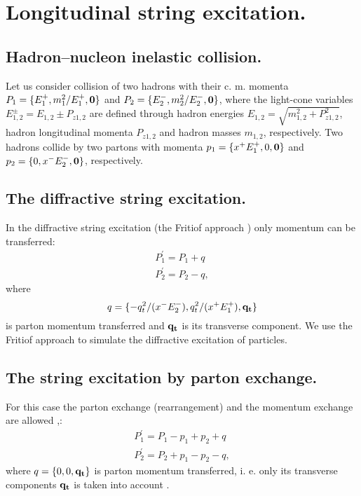 \section{Longitudinal string excitation.}

\subsection{Hadron--nucleon inelastic collision.}

\hspace{1.0em}Let us consider collision of two hadrons with their c. m. momenta 
$P_1 = \{E^{+}_1,m^2_1/E^{+}_1,{\bf 0}\}$ and $P_2 =
\{E^{-}_2,m^2_2/E^{-}_2,{\bf 0}\}$, where the light-cone variables
$E^{\pm}_{1,2} = E_{1,2} \pm P_{z1,2}$ are defined through hadron
energies $E_{1,2}=\sqrt{m^2_{1,2} + P^2_{z1,2}}$, hadron longitudinal
momenta $P_{z1,2}$ and hadron masses $m_{1,2}$, respectively. Two
hadrons collide by two partons with momenta $p_1 = \{x^{+}E^{+}_1,0,{\bf
0}\}$ and $p_2 = \{0, x^{-}E^{-}_2,{\bf 0}\}$, respectively.

\subsection{The diffractive string excitation.} 

In the diffractive string excitation (the Fritiof approach \cite{FRITIOF87})
 only momentum can be transferred:
\begin{equation}
\label{LSE1}
\begin{array}{cc}
P^{\prime}_1 = P_1 + q\\
P^{\prime}_2 = P_2 -q,
\end{array}
\end{equation}
where 
\begin{equation}
\label{LSE2}q=\{-q^2_t/(x^{-}E^{-}_2),q^2_t/(x^{+}E^{+}_1),\bf q_t \}
\end{equation}
 is parton 
momentum transferred and ${\bf q_t}$ is its transverse component.
We use the Fritiof approach to simulate the diffractive excitation of 
particles.
 
\subsection{The string excitation by parton exchange.}

\hspace{1.0em}For this case the parton exchange (rearrangement) and
the momentum exchange are allowed \cite{QGSM82},\cite{DPM94}:
\begin{equation}
\label{LSE3}
\begin{array}{cc}
P^{\prime}_1 = P_1 - p_1 + p_2 + q \\
P^{\prime}_2 = P_2 + p_1 - p_2 - q,
\end{array}
\end{equation}
where $q= \{0,0, {\bf q_t}\}$ is parton momentum transferred, i. e. only
its transverse components ${\bf q_t}$ is taken into account \cite{Am86}.

